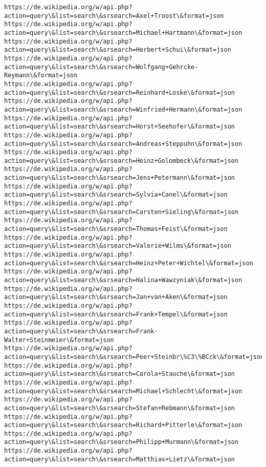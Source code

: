 \documentclass[11pt]{article}
\begin{document}
\begin{Verbatim}[commandchars=\\\{\}]
https://de.wikipedia.org/w/api.php?action=query\&list=search\&srsearch=Axel+Troost\&format=json
https://de.wikipedia.org/w/api.php?action=query\&list=search\&srsearch=Michael+Hartmann\&format=json
https://de.wikipedia.org/w/api.php?action=query\&list=search\&srsearch=Herbert+Schui\&format=json
https://de.wikipedia.org/w/api.php?action=query\&list=search\&srsearch=Wolfgang+Gehrcke-Reymann\&format=json
https://de.wikipedia.org/w/api.php?action=query\&list=search\&srsearch=Reinhard+Loske\&format=json
https://de.wikipedia.org/w/api.php?action=query\&list=search\&srsearch=Winfried+Hermann\&format=json
https://de.wikipedia.org/w/api.php?action=query\&list=search\&srsearch=Horst+Seehofer\&format=json
https://de.wikipedia.org/w/api.php?action=query\&list=search\&srsearch=Andreas+Steppuhn\&format=json
https://de.wikipedia.org/w/api.php?action=query\&list=search\&srsearch=Heinz+Golombeck\&format=json
https://de.wikipedia.org/w/api.php?action=query\&list=search\&srsearch=Jens+Petermann\&format=json
https://de.wikipedia.org/w/api.php?action=query\&list=search\&srsearch=Sylvia+Canel\&format=json
https://de.wikipedia.org/w/api.php?action=query\&list=search\&srsearch=Carsten+Sieling\&format=json
https://de.wikipedia.org/w/api.php?action=query\&list=search\&srsearch=Thomas+Feist\&format=json
https://de.wikipedia.org/w/api.php?action=query\&list=search\&srsearch=Valerie+Wilms\&format=json
https://de.wikipedia.org/w/api.php?action=query\&list=search\&srsearch=Heinz+Peter+Wichtel\&format=json
https://de.wikipedia.org/w/api.php?action=query\&list=search\&srsearch=Halina+Wawzyniak\&format=json
https://de.wikipedia.org/w/api.php?action=query\&list=search\&srsearch=Jan+van+Aken\&format=json
https://de.wikipedia.org/w/api.php?action=query\&list=search\&srsearch=Frank+Tempel\&format=json
https://de.wikipedia.org/w/api.php?action=query\&list=search\&srsearch=Frank-Walter+Steinmeier\&format=json
https://de.wikipedia.org/w/api.php?action=query\&list=search\&srsearch=Peer+Steinbr\%C3\%BCck\&format=json
https://de.wikipedia.org/w/api.php?action=query\&list=search\&srsearch=Carola+Stauche\&format=json
https://de.wikipedia.org/w/api.php?action=query\&list=search\&srsearch=Michael+Schlecht\&format=json
https://de.wikipedia.org/w/api.php?action=query\&list=search\&srsearch=Stefan+Rebmann\&format=json
https://de.wikipedia.org/w/api.php?action=query\&list=search\&srsearch=Richard+Pitterle\&format=json
https://de.wikipedia.org/w/api.php?action=query\&list=search\&srsearch=Philipp+Murmann\&format=json
https://de.wikipedia.org/w/api.php?action=query\&list=search\&srsearch=Matthias+Lietz\&format=json

\end{Verbatim}
\end{document}
